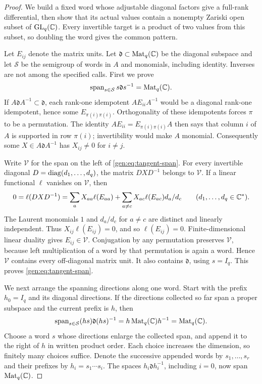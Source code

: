 \begin{proof}
We build a fixed word whose adjustable diagonal factors give a full-rank
differential, then show that its actual values contain a nonempty Zariski
open subset of $\operatorname{GL}_q(\mathbb C)$.  Every invertible target is a product of two
values from this subset, so doubling the word gives the common pattern.

Let $E_{ij}$ denote the matrix units.  Let
$\mathfrak d\subset\operatorname{Mat}_q(\mathbb C)$ be the diagonal subspace and let
$\mathcal S$ be the semigroup of words in $A$ and monomials, including
identity.  Inverses are not among the specified calls.  First we prove
\begin{equation}\label{gen:eq:tangent-span}
\operatorname{span}_{s\in\mathcal S}s\mathfrak d s^{-1}=\operatorname{Mat}_q(\mathbb C).
\end{equation}
If $A\mathfrak d A^{-1}\subset\mathfrak d$, each rank-one idempotent
$A E_{ii}A^{-1}$ would be a diagonal rank-one idempotent, hence some
$E_{\pi(i)\pi(i)}$.  Orthogonality of these idempotents forces $\pi$
to be a permutation.  The identity
$A E_{ii}=E_{\pi(i)\pi(i)}A$ then says that column $i$ of $A$ is
supported in row $\pi(i)$; invertibility would make $A$ monomial.
Consequently some $X\in A\mathfrak d A^{-1}$ has $X_{ij}\ne0$ for
$i\ne j$.

Write $\mathcal V$ for the span on the left of
\cref{gen:eq:tangent-span}.  For every invertible diagonal
$D=\operatorname{diag}(d_1,\ldots,d_q)$, the matrix $DXD^{-1}$ belongs to $\mathcal V$.
If a linear functional $\ell$ vanishes on $\mathcal V$, then
\[
0=\ell(DXD^{-1})
 =\sum_a X_{aa}\ell(E_{aa})
  +\sum_{a\ne c}X_{ac}\ell(E_{ac})d_a/d_c
\qquad(d_1,\ldots,d_q\in\mathbb C^*).
\]
The Laurent monomials $1$ and $d_a/d_c$ for $a\ne c$ are distinct and
linearly independent.  Thus $X_{ij}\ell(E_{ij})=0$, and so
$\ell(E_{ij})=0$.  Finite-dimensional linear duality gives
$E_{ij}\in\mathcal V$.  Conjugation by any permutation preserves
$\mathcal V$, because left multiplication of a word by that permutation
is again a word.  Hence $\mathcal V$ contains every off-diagonal matrix
unit.  It also contains $\mathfrak d$, using $s=I_q$.  This proves
\cref{gen:eq:tangent-span}.

We next arrange the spanning directions along one word.  Start with
the prefix $h_0=I_q$ and its diagonal directions.  If the directions
collected so far span a proper subspace and the current prefix is $h$,
then
\[
\operatorname{span}_{s\in\mathcal S}(hs)\mathfrak d(hs)^{-1}
 =h\operatorname{Mat}_q(\mathbb C)h^{-1}=\operatorname{Mat}_q(\mathbb C).
\]
Choose a word $s$ whose directions enlarge the collected span, and
append it to the right of $h$ in written product order.  Each choice
increases the dimension, so finitely many choices suffice.  Denote the
successive appended words by $s_1,\ldots,s_r$ and their prefixes by
$h_i=s_1\cdots s_i$.  The spaces $h_i\mathfrak d h_i^{-1}$, including
$i=0$, now span $\operatorname{Mat}_q(\mathbb C)$.


\end{proof}

